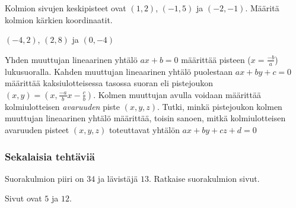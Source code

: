 \begin{tehtavasivu}
\begin{tehtava}
	Kolmion sivujen keskipisteet ovat $(1,2)$, $(-1,5)$ ja $(-2,-1)$. Määritä kolmion kärkien koordinaatit.
	\begin{vastaus}
		$(-4,2)$, $(2,8)$ ja $(0,-4)$
	\end{vastaus}
\end{tehtava}


\begin{tehtava}
  Yhden muuttujan lineaarinen yhtälö $ax +b = 0$ määrittää pisteen ($x = \frac{-b}{a}$) lukusuoralla.
  Kahden muuttujan lineaarinen yhtälö puolestaan $ax +by +c = 0$ määrittää kaksiulotteisessa tasossa suoran eli pistejoukon $(x,y) = (x, \frac{-a}{b}x - \frac{c}{b})$.
  Kolmen muuttujan avulla voidaan määrittää kolmiulotteisen \emph{avaruuden} piste $(x, y, z)$.
  Tutki, minkä pistejoukon kolmen muuttujan lineaarinen yhtälö määrittää, toisin sanoen, mitkä kolmiulotteisen avaruuden pisteet $(x, y, z)$ toteuttavat yhtälön $ax +by +cz +d = 0$
  \begin{vastaus}
  \end{vastaus}
\end{tehtava}

\subsubsection*{Sekalaisia tehtäviä}


\begin{tehtava} 
Suorakulmion piiri on $34$ ja lävistäjä $13$. Ratkaise suorakulmion sivut.
    \begin{vastaus}
	Sivut ovat $5$ ja $12$.
    \end{vastaus}
\end{tehtava}

\end{tehtavasivu}
